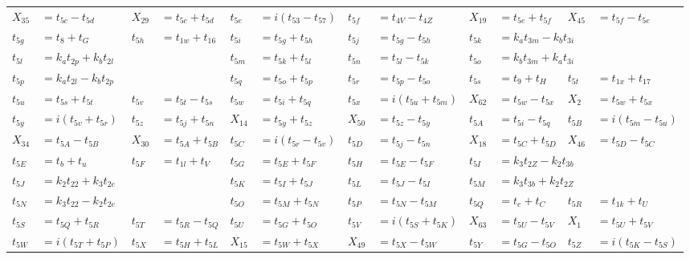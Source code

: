 \begin{tabular}{|p{4.3pt}l|p{4.3pt}l|p{4.3pt}l|p{4.3pt}l|p{4.3pt}l|p{4.3pt}l|}
$X_{35} $ &$= t_{5c} - t_{5d}$ & $X_{29} $ &$= t_{5c} + t_{5d}$ & $t_{5e} $ &$= i(t_{53} - t_{57})$ & $t_{5f} $ &$= t_{4V} - t_{4Z}$ & $X_{19} $ &$= t_{5e} + t_{5f}$ & $X_{45} $ &$= t_{5f} - t_{5e}$\\ 
$t_{5g} $ &$= t_8 + t_G$ & $t_{5h} $ &$= t_{1w} + t_{16}$ & $t_{5i} $ &$= t_{5g} + t_{5h}$ & $t_{5j} $ &$= t_{5g} - t_{5h}$ & $t_{5k} $ &\multicolumn{3}{l|}{$= k_at_{3m} - k_bt_{3i}$}\\ 
$t_{5l} $ &\multicolumn{3}{l|}{$= k_at_{2p} + k_bt_{2l}$} & $t_{5m} $ &$= t_{5k} + t_{5l}$ & $t_{5n} $ &$= t_{5l} - t_{5k}$ & $t_{5o} $ &\multicolumn{3}{l|}{$= k_bt_{3m} + k_at_{3i}$}\\ 
$t_{5p} $ &\multicolumn{3}{l|}{$= k_at_{2l} - k_bt_{2p}$} & $t_{5q} $ &$= t_{5o} + t_{5p}$ & $t_{5r} $ &$= t_{5p} - t_{5o}$ & $t_{5s} $ &$= t_9 + t_H$ & $t_{5t} $ &$= t_{1x} + t_{17}$\\ 
$t_{5u} $ &$= t_{5s} + t_{5t}$ & $t_{5v} $ &$= t_{5t} - t_{5s}$ & $t_{5w} $ &$= t_{5i} + t_{5q}$ & $t_{5x} $ &$= i(t_{5u} + t_{5m})$ & $X_{62} $ &$= t_{5w} - t_{5x}$ & $X_2 $ &$= t_{5w} + t_{5x}$\\ 
$t_{5y} $ &$= i(t_{5v} + t_{5r})$ & $t_{5z} $ &$= t_{5j} + t_{5n}$ & $X_{14} $ &$= t_{5y} + t_{5z}$ & $X_{50} $ &$= t_{5z} - t_{5y}$ & $t_{5A} $ &$= t_{5i} - t_{5q}$ & $t_{5B} $ &$= i(t_{5m} - t_{5u})$\\ 
$X_{34} $ &$= t_{5A} - t_{5B}$ & $X_{30} $ &$= t_{5A} + t_{5B}$ & $t_{5C} $ &$= i(t_{5r} - t_{5v})$ & $t_{5D} $ &$= t_{5j} - t_{5n}$ & $X_{18} $ &$= t_{5C} + t_{5D}$ & $X_{46} $ &$= t_{5D} - t_{5C}$\\ 
$t_{5E} $ &$= t_b + t_u$ & $t_{5F} $ &$= t_{1l} + t_V$ & $t_{5G} $ &$= t_{5E} + t_{5F}$ & $t_{5H} $ &$= t_{5E} - t_{5F}$ & $t_{5I} $ &\multicolumn{3}{l|}{$= k_3t_{2Z} - k_2t_{3b}$}\\ 
$t_{5J} $ &\multicolumn{3}{l|}{$= k_2t_{22} + k_3t_{2e}$} & $t_{5K} $ &$= t_{5I} + t_{5J}$ & $t_{5L} $ &$= t_{5J} - t_{5I}$ & $t_{5M} $ &\multicolumn{3}{l|}{$= k_3t_{3b} + k_2t_{2Z}$}\\ 
$t_{5N} $ &\multicolumn{3}{l|}{$= k_3t_{22} - k_2t_{2e}$} & $t_{5O} $ &$= t_{5M} + t_{5N}$ & $t_{5P} $ &$= t_{5N} - t_{5M}$ & $t_{5Q} $ &$= t_e + t_C$ & $t_{5R} $ &$= t_{1k} + t_U$\\ 
$t_{5S} $ &$= t_{5Q} + t_{5R}$ & $t_{5T} $ &$= t_{5R} - t_{5Q}$ & $t_{5U} $ &$= t_{5G} + t_{5O}$ & $t_{5V} $ &$= i(t_{5S} + t_{5K})$ & $X_{63} $ &$= t_{5U} - t_{5V}$ & $X_1 $ &$= t_{5U} + t_{5V}$\\ 
$t_{5W} $ &$= i(t_{5T} + t_{5P})$ & $t_{5X} $ &$= t_{5H} + t_{5L}$ & $X_{15} $ &$= t_{5W} + t_{5X}$ & $X_{49} $ &$= t_{5X} - t_{5W}$ & $t_{5Y} $ &$= t_{5G} - t_{5O}$ & $t_{5Z} $ &$= i(t_{5K} - t_{5S})$\\ 

\end{tabular}
